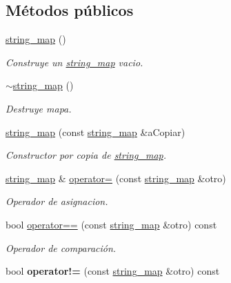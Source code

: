 \subsection*{Métodos públicos}
\begin{DoxyCompactItemize}
\item 
\hyperlink{classstring__map_acd7803d493b09db56e2e9022e526def7}{string\+\_\+map} ()
\begin{DoxyCompactList}\small\item\em Construye un \hyperlink{classstring__map}{string\+\_\+map} vacio. \end{DoxyCompactList}\item 
\hyperlink{classstring__map_a37b201370c0a6a3c2aa488dedbc0a9d7}{$\sim$string\+\_\+map} ()
\begin{DoxyCompactList}\small\item\em Destruye mapa. \end{DoxyCompactList}\item 
\hyperlink{classstring__map_a7b3039f5f5781ef989cce75dd496fc0d}{string\+\_\+map} (const \hyperlink{classstring__map}{string\+\_\+map} \&a\+Copiar)
\begin{DoxyCompactList}\small\item\em Constructor por copia de \hyperlink{classstring__map}{string\+\_\+map}. \end{DoxyCompactList}\item 
\hyperlink{classstring__map}{string\+\_\+map} \& \hyperlink{classstring__map_a8c3cbb3cd6ed7affff58c609a0f109db}{operator=} (const \hyperlink{classstring__map}{string\+\_\+map} \&otro)
\begin{DoxyCompactList}\small\item\em Operador de asignacion. \end{DoxyCompactList}\item 
bool \hyperlink{classstring__map_a424a95ef628cc97aeedae51f98ee2345}{operator==} (const \hyperlink{classstring__map}{string\+\_\+map} \&otro) const 
\begin{DoxyCompactList}\small\item\em Operador de comparación. \end{DoxyCompactList}\item 
\hypertarget{classstring__map_aaa9e3e8289202b72f1b0b7b0268c3fe7}{bool {\bfseries operator!=} (const \hyperlink{classstring__map}{string\+\_\+map} \&otro) const }\label{classstring__map_aaa9e3e8289202b72f1b0b7b0268c3fe7}


\end{DoxyCompactItemize}
